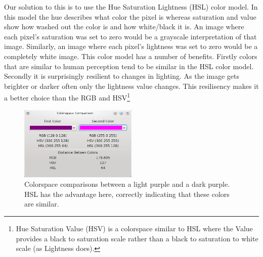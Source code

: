 \documentclass{article}
\renewcommand{\|}{\origbar} %
\begin{document}
Our solution to this is to use the Hue Saturation Lightness (HSL) color model. In this model the hue describes what color the pixel is whereas saturation and value show how washed out the color is and how white/black it is. An image where each pixel's saturation was set to zero would be a grayscale interpretation of that image. Similarly, an image where each pixel's lightness was set to zero would be a completely white image. This color model has a number of benefits. Firstly colors that are similar to human perception tend to be similar in the HSL color model. Secondly it is surprisingly resilient to changes in lighting. As the image gets brighter or darker often only the lightness value changes. This resilisency makes it a better choice than the RGB and HSV\footnote{Hue Saturation Value (HSV) is a colorspace similar to HSL where the Value provides a black to saturation scale rather than a black to saturation to white scale (as Lightness does).}

\begin{figure}[h!]
  \begin{center}
    \includegraphics[width=0.5\textwidth]{colorspace_comparison_application.png}
  \end{center}
  \caption{Colorspace comparisons between a light purple and a dark purple. HSL has the advantage here, correctly indicating that these colors are similar.}
  \label{fig:colorspaceComparison}
\end{figure}
\end{document}
